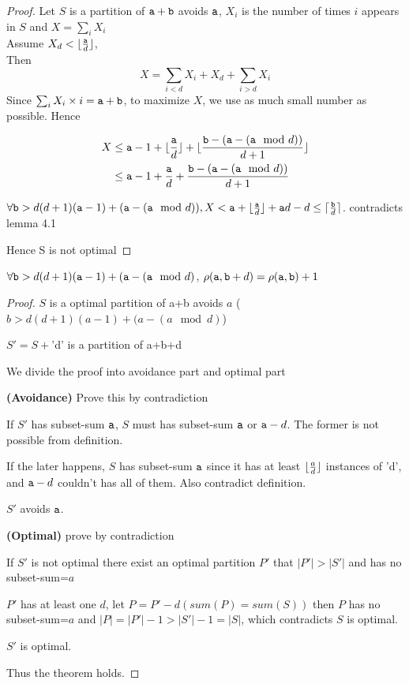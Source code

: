 \begin{proof} 
    Let $S$ is a partition of $\mathtt{a}+\mathtt{b}$ avoids $\mathtt{a}$,   $X_i$ is the number of times $i$ appears in $S$  and  $X = \sum_i{X_i}$  \\  

    Assume $X_d<\lfloor{\frac{\mathtt{a}}{d}} \rfloor $, \\

    Then 
    \[
    X=\sum_{i<d}{X_i}+X_d+\sum_{i>d}{X_i}
    \]
    Since $\sum_i{X_i\times i}=\mathtt{a}+\mathtt{b}$, to maximize $X$, we use as much small number as possible. Hence

    \begin{align*}
    X&\leq \mathtt{a}-1+ \lfloor\frac{\mathtt{a}}{d}\rfloor   +\lfloor{\frac{\mathtt{b}-(\mathtt{a}- (\mathtt{a}\mod d))}{d+1}}\rfloor\\
     &\leq \mathtt{a}-1+ \frac{\mathtt{a}}{d}   +{\frac{\mathtt{b}-(\mathtt{a} - (\mathtt{a}\mod d))}{d+1}}
    \end{align*}
    
    $\forall \mathtt{b}>d(d+1)(\mathtt{a}-1) + (\mathtt{a} - (\mathtt{a}\mod d)), \\
    X<\mathtt{a}+\lfloor\frac{\mathtt{a}}{d}\rfloor + \mathtt{a} d -d \leq \lceil\frac{\mathtt{b}}{d}\rceil$.    contradicts lemma 4.1

    Hence  S is not optimal
\end{proof}

\begin{theorem}
	$\forall \mathtt{b}>d(d+1)(\mathtt{a}-1)  + (\mathtt{a} - (\mathtt{a}\mod d)$, $\rho(\mathtt{a},\mathtt{b}+d)=\rho(\mathtt{a},\mathtt{b})+1$
\end{theorem}

\begin{proof}
    $S$ is a optimal partition of a+b avoids $a$ ($b>d(d+1)(a-1)  + (a - (a\mod d)$)
    
    $S'=S+$'d' is a partition of a+b+d 

    We divide the proof into avoidance part and optimal part

    {\bf(Avoidance)}
    Prove this by contradiction

    If $S'$ has subset-sum $\mathtt{a}$, $S$ must has subset-sum $\mathtt{a}$ or $\mathtt{a}-d$. The former is not possible from definition. 

    If the later happens, $S$ has subset-sum $\mathtt{a}$ since it has at least $\lfloor{\frac{a}{d}}\rfloor$ instances of 'd', and $\mathtt{a}-d$ couldn't has all of them.
    Also contradict definition.

    $S'$ avoids $\mathtt{a}$.

    {\bf(Optimal)}
        prove by contradiction

        If $S'$ is not optimal there exist an optimal partition $P'$ that $|P'|>|S'|$ and has no subset-sum=$a$

        $P'$ has at least one $d$, let $P=P'-d(sum(P)=sum(S))$ then $P$ has no subset-sum=$a$ and $|P|=|P'|-1>|S'|-1=|S|$, which contradicts $S$ is optimal.

        $S'$ is optimal.

    Thus the theorem holds.
\end{proof}

